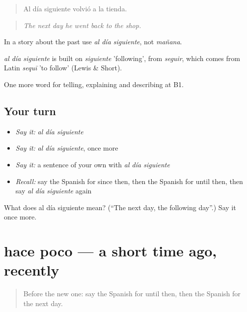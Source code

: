 \begin{quote}
Al día siguiente volvió a la tienda.
\end{quote}

\begin{quote}
\emph{The next day he went back to the shop.}
\end{quote}

In a story about the past use \emph{al día siguiente}, not \emph{mañana}.

\begin{cousinweb}
\emph{al día siguiente} is built on \emph{siguiente} 'following', from \emph{seguir}, which comes from Latin \emph{sequī} 'to follow' (Lewis \& Short).
\end{cousinweb}

\begin{grammarlens}[title={What you've built}]
One more word for telling, explaining and describing at B1.
\end{grammarlens}

\subsection*{Your turn}
\begin{itemize}
\raggedright
  \item \emph{Say it:} \emph{al día siguiente}
  \item \emph{Say it:} \emph{al día siguiente}, once more
  \item \emph{Say it:} a sentence of your own with \emph{al día siguiente}
  \item \emph{Recall:} say the Spanish for since then, then the Spanish for until then, then say \emph{al día siguiente} again
\end{itemize}

\begin{tcolorbox}[breakable,colback=teal!4,colframe=teal!35!black,title={Before you move on}]
What does al día siguiente mean? (\textquotedblleft{}The next day, the following day\textquotedblright{}.) Say it once more.
\end{tcolorbox}
\section[hace poco]{hace poco — a short time ago, recently}

\label{lesson:ES-C537-hace-poco}



\begin{quote}
Before the new one: say the Spanish for until then, then the Spanish for the next day.
\end{quote}

